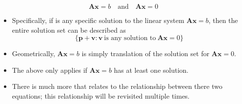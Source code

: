 \begin{itemize}
  \[%
  \bm{Ax}=b \quad \text{and} \quad \bm{Ax}=0
  \]%
  \begin{itemize}
    \item Specifically, if  is any specific solution to the linear system \(\bm{Ax} = b\), then the entire solution set can be described as
    \[%
    \{\bm{p}+\bm{v}: \bm{v} ~\text{is any solution to}~\bm{Ax}=0\}
    \]%
    \item Geometrically, \( \bm{Ax}=b\) is simply translation of the solution set for \( \bm{Ax}=0\).
    \item The above only applies if \( \bm{Ax}=b \) has at least one solution.
    \item There is much more that relates to the relationship between there two equations; this relationship will be revisited multiple times.
  \end{itemize}
  
\end{itemize}
  
  
